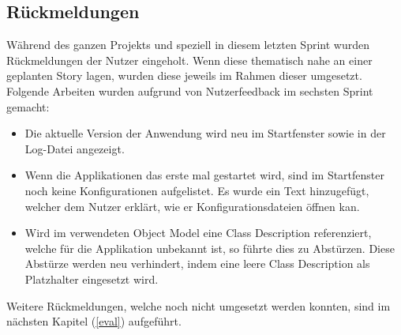 \subsection{Rückmeldungen}
Während des ganzen Projekts und speziell in diesem letzten Sprint wurden Rückmeldungen der Nutzer eingeholt.
Wenn diese thematisch nahe an einer geplanten Story lagen, wurden diese jeweils im Rahmen dieser umgesetzt.
Folgende Arbeiten wurden aufgrund von Nutzerfeedback im sechsten Sprint gemacht:
\begin{itemize}
   \item Die aktuelle Version der Anwendung wird neu im Startfenster sowie in der Log-Datei angezeigt.
   \item Wenn die Applikationen das erste mal gestartet wird, sind im Startfenster noch keine Konfigurationen aufgelistet.
Es wurde ein Text hinzugefügt, welcher dem Nutzer erklärt, wie er Konfigurationsdateien öffnen kan.
   \item Wird im verwendeten Object Model eine Class Description referenziert, welche für die Applikation unbekannt ist, so führte dies zu Abstürzen.
Diese Abstürze werden neu verhindert, indem eine leere Class Description als Platzhalter eingesetzt wird.
\end{itemize}
Weitere Rückmeldungen, welche noch nicht umgesetzt werden konnten, sind im nächsten Kapitel (\ref{eval}) aufgeführt.









